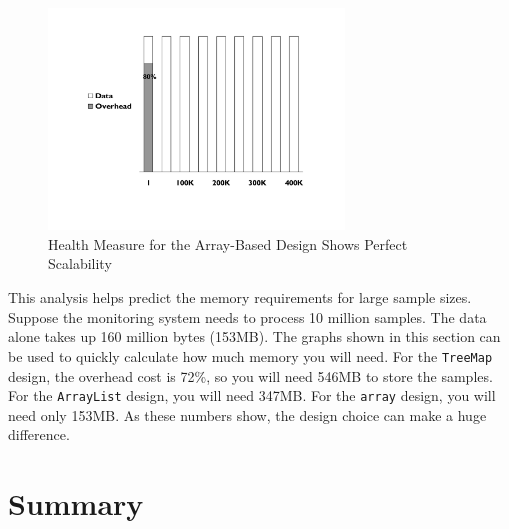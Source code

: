 \begin{figure}
  \centering
  \includegraphics[width=0.7\textwidth]{Figures/chapter3/scalable-health-array}
  \caption{Health Measure for the Array-Based Design Shows Perfect Scalability}
  \label{fig:scalable-health-array}
\end{figure}

This analysis helps predict the memory requirements for large sample sizes. Suppose the monitoring system needs to process 10 million samples. The data alone takes up 160 million bytes (153MB).  The graphs shown in this section can be used to quickly calculate how much memory you will need. For the \texttt{TreeMap} design, the overhead cost is 72\%, so you will need 546MB to store the samples. For the \texttt{ArrayList} design, you will need 347MB. For the \texttt{array} design, you will need only 153MB. As these numbers show, the design choice can make a huge difference.

\section{Summary}

